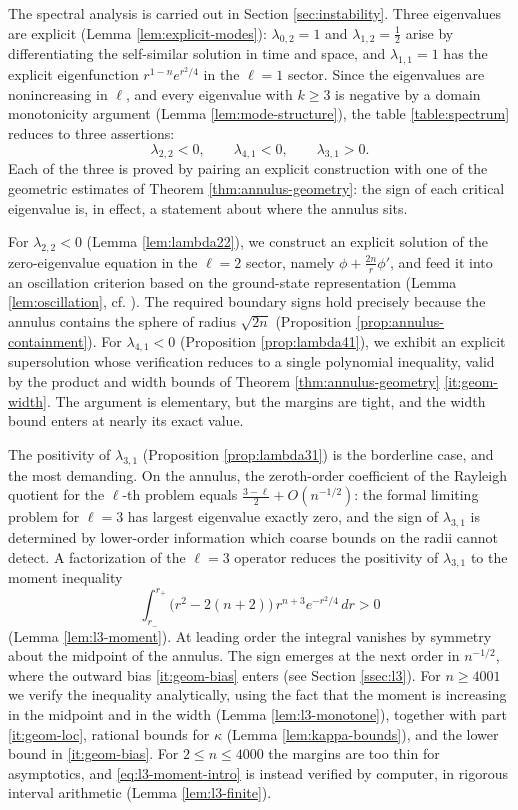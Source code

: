 \documentclass[11pt]{article}
\numberwithin{equation}{section}
\theoremstyle{definition}
\begin{document}
The spectral analysis is carried out in Section \ref{sec:instability}. Three eigenvalues are explicit (Lemma \ref{lem:explicit-modes}): $\lambda_{0,2}=1$ and $\lambda_{1,2}=\frac12$ arise by differentiating the self-similar solution in time and space, and $\lambda_{1,1}=1$ has the explicit eigenfunction $r^{1-n}e^{r^2/4}$ in the $\ell=1$ sector. Since the eigenvalues are nonincreasing in $\ell$, and every eigenvalue with $k\geq3$ is negative by a domain monotonicity argument (Lemma \ref{lem:mode-structure}), the table \eqref{table:spectrum} reduces to three assertions:
\[
    \lambda_{2,2}<0, \qquad \lambda_{4,1}<0, \qquad \lambda_{3,1}>0.
\]
Each of the three is proved by pairing an explicit construction with one of the geometric estimates of Theorem \ref{thm:annulus-geometry}: the sign of each critical eigenvalue is, in effect, a statement about where the annulus sits.

For $\lambda_{2,2}<0$ (Lemma \ref{lem:lambda22}), we construct an explicit solution of the zero-eigenvalue equation in the $\ell=2$ sector, namely $\phi+\frac{2n}{r}\phi'$, and feed it into an oscillation criterion based on the ground-state representation (Lemma \ref{lem:oscillation}, cf. \cite{PT06}). The required boundary signs hold precisely because the annulus contains the sphere of radius $\sqrt{2n}$ (Proposition \ref{prop:annulus-containment}). For $\lambda_{4,1}<0$ (Proposition \ref{prop:lambda41}), we exhibit an explicit supersolution whose verification reduces to a single polynomial inequality, valid by the product and width bounds of Theorem \ref{thm:annulus-geometry} \ref{it:geom-width}. The argument is elementary, but the margins are tight, and the width bound enters at nearly its exact value.

The positivity of $\lambda_{3,1}$ (Proposition \ref{prop:lambda31}) is the borderline case, and the most demanding. On the annulus, the zeroth-order coefficient of the Rayleigh quotient for the $\ell$-th problem equals $\frac{3-\ell}{2}+O(n^{-1/2})$: the formal limiting problem for $\ell=3$ has largest eigenvalue exactly zero, and the sign of $\lambda_{3,1}$ is determined by lower-order information which coarse bounds on the radii cannot detect. A factorization of the $\ell=3$ operator reduces the positivity of $\lambda_{3,1}$ to the moment inequality
\begin{equation}\label{eq:l3-moment-intro}
    \int_{r_-}^{r_+}\bigl(r^2-2(n+2)\bigr)\,r^{n+3}e^{-r^2/4}\,dr>0
\end{equation}
(Lemma \ref{lem:l3-moment}). At leading order the integral vanishes by symmetry about the midpoint of the annulus. The sign emerges at the next order in $n^{-1/2}$, where the outward bias \ref{it:geom-bias} enters (see Section \ref{ssec:l3}). For $n\geq4001$ we verify the inequality analytically, using the fact that the moment is increasing in the midpoint and in the width (Lemma \ref{lem:l3-monotone}), together with part \ref{it:geom-loc}, rational bounds for $\kappa$ (Lemma \ref{lem:kappa-bounds}), and the lower bound in \ref{it:geom-bias}.  For $2\leq n\leq4000$ the margins are too thin for asymptotics, and \eqref{eq:l3-moment-intro} is instead verified by computer, in rigorous interval arithmetic (Lemma \ref{lem:l3-finite}).
\end{document}
